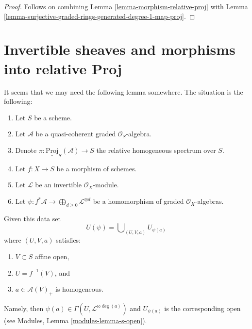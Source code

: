\begin{proof}
Follows on combining
Lemma \ref{lemma-morphism-relative-proj}
with
Lemma \ref{lemma-surjective-graded-rings-generated-degree-1-map-proj}.
\end{proof}

















\section{Invertible sheaves and morphisms into relative Proj}
\label{section-invertible-relative-proj}

\noindent
It seems that we may need the following lemma somewhere.
The situation is the following:
\begin{enumerate}
\item Let $S$ be a scheme.
\item Let $\mathcal{A}$ be a quasi-coherent graded $\mathcal{O}_S$-algebra.
\item Denote $\pi : \underline{\text{Proj}}_S(\mathcal{A}) \to S$ the relative
homogeneous spectrum over $S$.
\item Let $f : X \to S$ be a morphism of schemes.
\item Let $\mathcal{L}$ be an invertible $\mathcal{O}_X$-module.
\item Let $\psi : f^*\mathcal{A} \to
\bigoplus_{d \geq 0} \mathcal{L}^{\otimes d}$
be a homomorphism of graded $\mathcal{O}_X$-algebras.
\end{enumerate}
Given this data set
$$
U(\psi) = \bigcup\nolimits_{(U, V, a)} U_{\psi(a)}
$$
where $(U, V, a)$ satisfies:
\begin{enumerate}
\item $V \subset S$ affine open,
\item $U = f^{-1}(V)$, and
\item $a \in \mathcal{A}(V)_{+}$ is homogeneous.
\end{enumerate}
Namely, then $\psi(a) \in \Gamma(U, \mathcal{L}^{\otimes \deg(a)})$
and $U_{\psi(a)}$ is the corresponding open (see
Modules, Lemma \ref{modules-lemma-s-open}).

